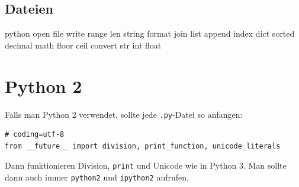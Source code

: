 \subsection{Dateien} 
python
    open
    file
        write
    range
    len
    string
        format
        join
    list
        append
        index
    dict
    sorted
    decimal
    math
        floor
        ceil
    convert
        str
        int
        float



\section{Python 2}
Falls man Python 2 verwendet, sollte jede \texttt{.py}-Datei so anfangen:
\begin{verbatim}
# coding=utf-8
from __future__ import division, print_function, unicode_literals
\end{verbatim}
Dann funktionieren Division, \texttt{print} und Unicode wie in Python 3.
Man sollte dann auch immer \texttt{python2} und \texttt{ipython2} aufrufen.

